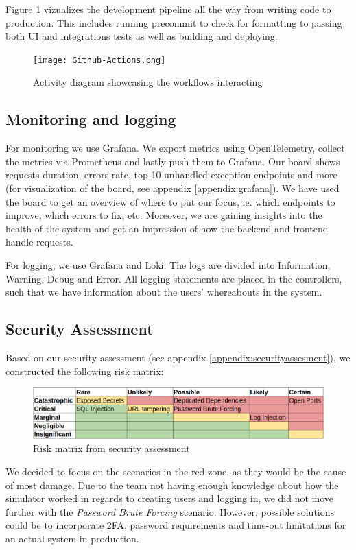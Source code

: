 Figure \ref{fig:workflows} vizualizes the development pipeline all the way from writing code to production. This includes running precommit to check for formatting to passing both UI and integrations tests as well as building and deploying.

\begin{figure}[H]
    \centering
    \texttt{[image: Github-Actions.png]}
    \caption{Activity diagram showcasing the workflows interacting }
    \label{fig:workflows}
\end{figure}

\subsection{Monitoring and logging}
For monitoring we use Grafana. We export metrics using OpenTelemetry, collect the metrics via Prometheus and lastly push them to Grafana. Our board shows requests duration, errors rate, top 10 unhandled exception endpoints and more (for visualization of the board, see appendix \ref{appendix:grafana}). We have used the board to get an overview of where to put our focus, ie. which endpoints to improve, which errors to fix, etc. Moreover, we are gaining insights into the health of the system and get an impression of how the backend and frontend handle requests.

For logging, we use Grafana and Loki. The logs are divided into Information, Warning, Debug and Error. All logging statements are placed in the controllers, such that we have information about the users' whereabouts in the system.

\subsection{Security Assessment}
Based on our security assessment (see appendix \ref{appendix:securityassesment}), we constructed the following risk matrix:
\begin{figure}[H]
    \centering
    \includegraphics[width=1\linewidth]{images/risk-matrix.png}
    \caption{Risk matrix from security assessment}
    \label{fig:enter-label}
\end{figure}
We decided to focus on the scenarios in the red zone, as they would be the cause of most damage. Due to the team not having enough knowledge about how the simulator worked in regards to creating users and logging in, we did not move further with the \textit{Password Brute Forcing} scenario. However, possible solutions could be to incorporate 2FA, password requirements and time-out limitations for an actual system in production.

